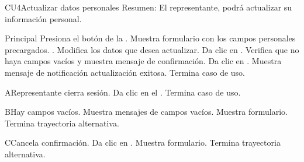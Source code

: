 

	\begin{UseCase}{CU4}{Actualizar datos personales}{
		Resumen: El representante, podrá actualizar su información personal.}
		
	\end{UseCase}
	\newpage
	
	\begin{UCtrayectoria}{Principal}
	\UCpaso[\UCactor] Presiona el botón  de la .
	\UCpaso Muestra formulario con los campos personales precargados. .
	\UCpaso[\UCactor] Modifica los datos que desea actualizar. 
	\UCpaso[\UCactor] Da clic en .
	\UCpaso Verifica que no haya campos vacíos y muestra mensaje de confirmación. 
	\UCpaso[\UCactor] Da clic en  .
	\UCpaso Muestra mensaje de notificación actualización exitosa. 
	\UCpaso Termina caso de uso.
\end{UCtrayectoria}
	
	\begin{UCtrayectoriaA}{A}{Representante cierra sesión.}
		\UCpaso[\UCactor] Da clic en el .
		\UCpaso Termina caso de uso.
	\end{UCtrayectoriaA}
	
	\begin{UCtrayectoriaA}{B}{Hay campos vacíos.}
		\UCpaso Muestra mensajes de campos vacíos.
		\UCpaso Muestra formulario.
		\UCpaso Termina trayectoria alternativa.
	\end{UCtrayectoriaA}
	
	\begin{UCtrayectoriaA}{C}{Cancela confirmación.}
		\UCpaso[\UCactor] Da clic en .
		\UCpaso Muestra formulario.
		\UCpaso Termina trayectoria alternativa.
	\end{UCtrayectoriaA}

